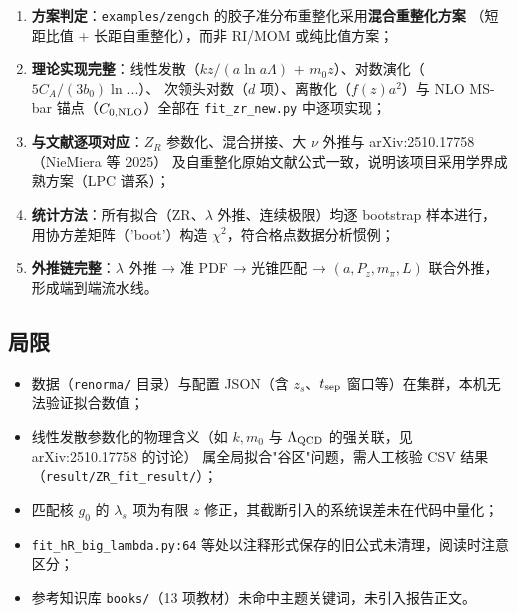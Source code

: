 \documentclass[UTF8]{ctexart}
\begin{document}
\begin{enumerate}
  \item \textbf{方案判定}：\texttt{examples/zengch} 的胶子准分布重整化采用\textbf{混合重整化方案}
        （短距比值 + 长距自重整化），而非 RI/MOM 或纯比值方案；
  \item \textbf{理论实现完整}：线性发散（$kz/(a\ln a\Lambda)$ + $m_0z$）、对数演化（$5C_A/(3b_0)\ln...$）、
        次领头对数（$d$ 项）、离散化（$f(z)a^2$）与 NLO MS-bar 锚点（$C_{0,\rm NLO}$）全部在
        \texttt{fit\_zr\_new.py} 中逐项实现；
  \item \textbf{与文献逐项对应}：$Z_R$ 参数化、混合拼接、大 $\nu$ 外推与 arXiv:2510.17758（NieMiera 等 2025）
        及自重整化原始文献公式一致，说明该项目采用学界成熟方案（LPC 谱系）；
  \item \textbf{统计方法}：所有拟合（ZR、$\lambda$ 外推、连续极限）均逐 bootstrap 样本进行，
        用协方差矩阵（'boot'）构造 $\chi^2$，符合格点数据分析惯例；
  \item \textbf{外推链完整}：$\lambda$ 外推 → 准 PDF → 光锥匹配 → $(a, P_z, m_\pi, L)$ 联合外推，
        形成端到端流水线。
\end{enumerate}

\subsection{局限}

\begin{itemize}
  \item 数据（\texttt{renorma/} 目录）与配置 JSON（含 $z_s$、$t_{\rm sep}$ 窗口等）在集群，本机无法验证拟合数值；
  \item 线性发散参数化的物理含义（如 $k, m_0$ 与 $\Lambda_{\rm QCD}$ 的强关联，见 arXiv:2510.17758 的讨论）
        属全局拟合"谷区"问题，需人工核验 CSV 结果（\texttt{result/ZR\_fit\_result/}）；
  \item 匹配核 $g_0$ 的 $\lambda_s$ 项为有限 $z$ 修正，其截断引入的系统误差未在代码中量化；
  \item \texttt{fit\_hR\_big\_lambda.py:64} 等处以注释形式保存的旧公式未清理，阅读时注意区分；
  \item 参考知识库 \texttt{books/}（13 项教材）未命中主题关键词，未引入报告正文。
\end{itemize}
\end{document}
